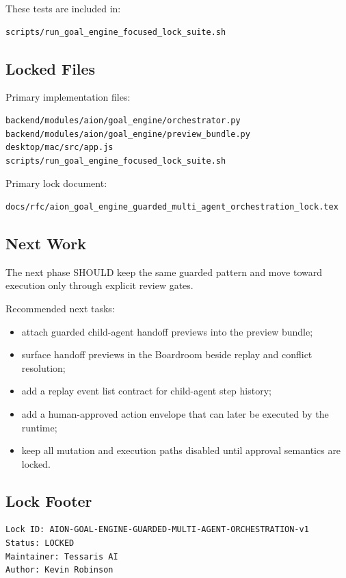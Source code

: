 These tests are included in:

\begin{verbatim}
scripts/run_goal_engine_focused_lock_suite.sh
\end{verbatim}

\subsection{Locked Files}

Primary implementation files:

\begin{verbatim}
backend/modules/aion/goal_engine/orchestrator.py
backend/modules/aion/goal_engine/preview_bundle.py
desktop/mac/src/app.js
scripts/run_goal_engine_focused_lock_suite.sh
\end{verbatim}

Primary lock document:

\begin{verbatim}
docs/rfc/aion_goal_engine_guarded_multi_agent_orchestration_lock.tex
\end{verbatim}

\subsection{Next Work}

The next phase SHOULD keep the same guarded pattern and move toward execution only through explicit review gates.

Recommended next tasks:

\begin{itemize}
  \item attach guarded child-agent handoff previews into the preview bundle;
  \item surface handoff previews in the Boardroom beside replay and conflict resolution;
  \item add a replay event list contract for child-agent step history;
  \item add a human-approved action envelope that can later be executed by the runtime;
  \item keep all mutation and execution paths disabled until approval semantics are locked.
\end{itemize}

\subsection{Lock Footer}

\begin{verbatim}
Lock ID: AION-GOAL-ENGINE-GUARDED-MULTI-AGENT-ORCHESTRATION-v1
Status: LOCKED
Maintainer: Tessaris AI
Author: Kevin Robinson
\end{verbatim}
